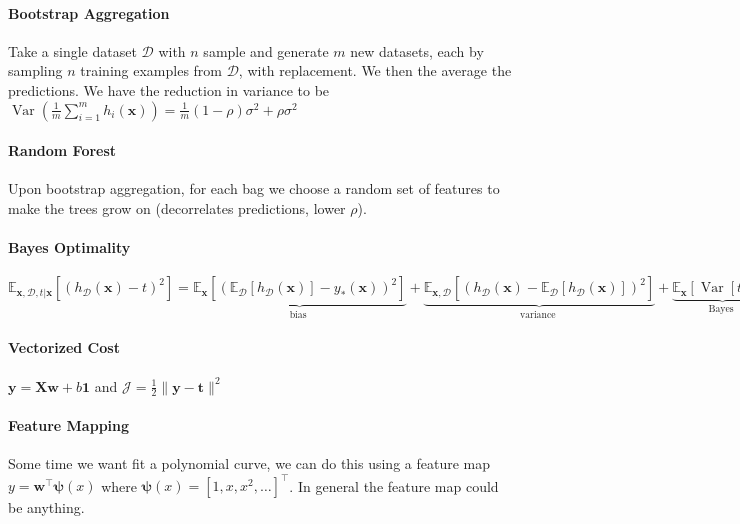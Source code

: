 \documentclass[10pt]{article}
\begin{document}
\paragraph{Bootstrap Aggregation} Take a single dataset $\mathcal{D}$ with $n$ sample and generate $m$ new datasets, each by sampling $n$ training examples from $\mathcal{D}$, with replacement. We then the average the predictions. We have the reduction in variance to be $\operatorname{Var}\left(\frac{1}{m} \sum_{i=1}^{m} h_{i}(\mathbf{x})\right)=\frac{1}{m}(1-\rho) \sigma^{2}+\rho \sigma^{2}$ 

\paragraph{Random Forest} Upon bootstrap aggregation, for each bag we choose a random set of features to make the trees grow on (decorrelates predictions, lower $\rho$). 

\paragraph{Bayes Optimality} $\mathbb{E}_{\mathbf{x}, \mathcal{D}, t | \mathbf{x}}\left[\left(h_{\mathcal{D}}(\mathbf{x})-t\right)^{2}\right]=  \underbrace{\mathbb{E}_{\mathbf{x}}\left[\left(\mathbb{E}_{\mathcal{D}}\left[h_{\mathcal{D}}(\mathbf{x})\right]-y_{*}(\mathbf{x})\right)^{2}\right]}_{\text {bias }}+\underbrace{\mathbb{E}_{\mathbf{x}, \mathcal{D}}\left[\left(h_{\mathcal{D}}(\mathbf{x})-\mathbb{E}_{\mathcal{D}}\left[h_{\mathcal{D}}(\mathbf{x})\right]\right)^{2}\right]}_{\text {variance }}+\underbrace{\mathbb{E}_{\mathbf{x}}[\operatorname{Var}[t | \mathbf{x}]]}_{\text {Bayes }} $

\paragraph{Vectorized Cost} $\mathbf{y}=\mathbf{X} \mathbf{w}+b \mathbf{1}$ and $\mathcal{J}=\frac{1}{2}\|\mathbf{y}-\mathbf{t}\|^{2}$ 


\paragraph{Feature Mapping} Some time we want fit a polynomial curve, we can do this using a feature map $y=\mathbf{w}^{\top} \boldsymbol{\psi}(x)$ where $\boldsymbol{\psi}(x)=\left[1, x, x^{2}, \ldots\right]^{\top}$. In general the feature map could be anything. 
\end{document}
